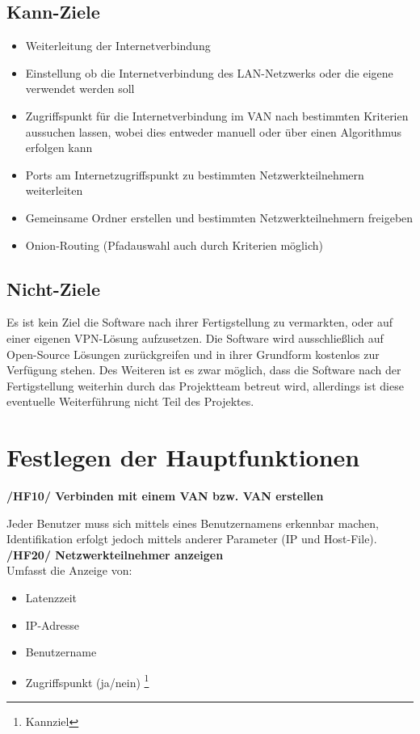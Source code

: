 \documentclass[a4paper,12pt]{scrreprt}
\begin{document}
		\subsection{Kann-Ziele}
			\begin{itemize}
			\item Weiterleitung der Internetverbindung
			\item Einstellung ob die Internetverbindung des LAN-Netzwerks oder die eigene verwendet werden soll
			\item Zugriffspunkt für die Internetverbindung im VAN nach bestimmten Kriterien aussuchen lassen, wobei dies entweder manuell oder über einen Algorithmus erfolgen kann
			
			\item Ports am Internetzugriffspunkt zu bestimmten Netzwerkteilnehmern weiterleiten
			\item Gemeinsame Ordner erstellen und bestimmten Netzwerkteilnehmern freigeben
			
			\item Onion-Routing (Pfadauswahl auch durch Kriterien möglich)
			
			\end{itemize}
			
		\subsection{Nicht-Ziele}
			Es ist kein Ziel die Software nach ihrer Fertigstellung zu vermarkten, oder auf einer eigenen VPN-Lösung aufzusetzen. Die Software wird ausschließlich auf Open-Source Lösungen zurückgreifen und in ihrer Grundform kostenlos zur Verfügung stehen. Des Weiteren ist es zwar möglich, dass die Software nach der Fertigstellung weiterhin durch das Projektteam betreut wird, allerdings ist diese eventuelle Weiterführung nicht Teil des Projektes.
			
	\section{Festlegen der Hauptfunktionen}
		\textbf{/HF10/ Verbinden mit einem VAN bzw. VAN erstellen}
		
		Jeder Benutzer muss sich mittels eines Benutzernamens erkennbar machen, Identifikation erfolgt jedoch mittels anderer Parameter (IP und Host-File). \\
		
		
		\textbf {/HF20/ Netzwerkteilnehmer anzeigen
		}\\
		Umfasst die Anzeige von:
		\begin{itemize}
		
	
		\item Latenzzeit
		\item IP-Adresse
		\item Benutzername
		\item Zugriffspunkt (ja/nein) \footnote{Kannziel}\\
			\end{itemize}
		
\end{document}

